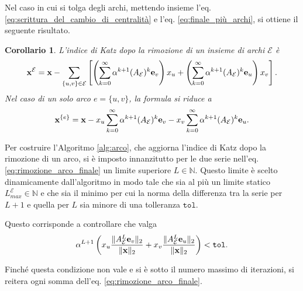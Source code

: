 \documentclass[a4paper]{article}
\newcommand{\NN}{\mathbb{N}}
\newcommand{\evec}{{\bf e}}
\newcommand{\xvec}{{\bf x}}
\newcommand{\cE}{\mathcal{E}}
\newtheorem{corollary}{Corollario}
\begin{document}
	Nel caso in cui si tolga degli archi, mettendo insieme l'eq. \eqref{eq:scrittura_del_cambio_di_centralità} e l'eq. \eqref{eq:finale_più_archi}, si ottiene il seguente risultato.
	
	\begin{corollary}
		L'indice di Katz dopo la rimozione di un insieme
		di archi $\cE$ è
		\begin{equation}
			\xvec^\cE = \xvec - \sum_{\{u,v\}\in \cE} \left[
				\left(\sum_{k=0}^{\infty} \alpha^{k+1}(A_\cE)^k \evec_v \right) x_u 
			+ \left(\sum_{k=0}^{\infty} \alpha^{k+1} (A_\cE)^k \evec_u \right) x_v \right].
		\end{equation}
		Nel caso di un solo arco $e = \{u, v\}$, la formula si
		riduce a
		\begin{equation} \label{eq:rimozione_arco_finale}
			\xvec^{\{e\}} = \xvec -
			x_u \sum_{k=0}^{\infty} \alpha^{k+1}(A_\cE)^k \evec_v 
			- x_v \sum_{k=0}^{\infty} \alpha^{k+1} (A_\cE)^k \evec_u.
		\end{equation}
	\end{corollary}
	
	Per costruire l'Algoritmo \ref{alg:arco}, che aggiorna l'indice di Katz dopo la rimozione
	di un arco, si è imposto innanzitutto per le due serie nell'eq. \eqref{eq:rimozione_arco_finale} un limite superiore $L \in \NN$. Questo limite è scelto dinamicamente dall'algoritmo
	in modo tale che sia al più un limite statico $L_{max}^\cE \in \NN$ e che sia il minimo per cui la norma della differenza tra la serie per $L+1$
	e quella per $L$ sia minore di una tolleranza $\texttt{tol}$.
	
	Questo corrisponde a controllare che valga
	\[
		\alpha^{L+1}\left( x_u
		\frac{\|A_\cE^L \evec_v\|_2}{\|\xvec\|_2} +
		x_v \frac{\|A_\cE^L \evec_u\|_2}{\|\xvec\|_2}
		\right) < \texttt{tol}.
	\]
	
	Finché questa condizione non vale e si è sotto il numero massimo di iterazioni, si reitera ogni somma dell'eq. \eqref{eq:rimozione_arco_finale}.
	
\end{document}
